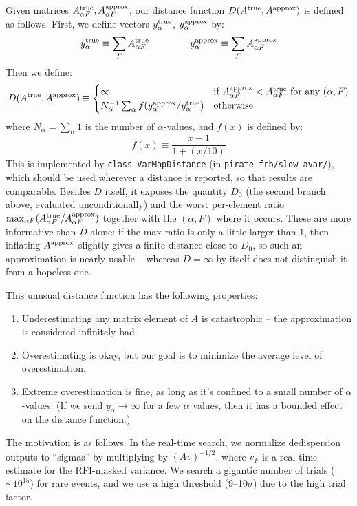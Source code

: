 \documentclass{article}
\numberwithin{equation}{section}   %
\begin{document}
Given matrices $A^{\rm true}_{\alpha F}, A^{\rm approx}_{\alpha F}$,
our distance function $D(A^{\rm true}, A^{\rm approx})$ is defined as follows.
First, we define vectors
$y^{\rm true}_{\alpha}$, $y^{\rm approx}_{\alpha}$ by:
\begin{equation}
y^{\rm true}_{\alpha} \equiv \sum_F A^{\rm true}_{\alpha F}
  \hspace{1.5cm}
y^{\rm approx}_{\alpha} \equiv \sum_F A^{\rm approx}_{\alpha F}
\end{equation}
Then we define:
\begin{equation}
D(A^{\rm true}, A^{\rm approx})
 \equiv \begin{cases}
   \infty & \mbox{if $A^{\rm approx}_{\alpha F} < A^{\rm true}_{\alpha F}$ for any $(\alpha,F)$} \\
   N_\alpha^{-1} \sum_\alpha f(y_\alpha^{\rm approx}/y_\alpha^{\rm true})
    & \mbox{otherwise}
\end{cases} 
\label{eq:distance_function}
\end{equation}
where $N_\alpha = \sum_\alpha 1$ is the number of $\alpha$-values, and $f(x)$ is defined by:
\begin{equation}
f(x) \equiv \frac{x-1}{1+(x/10)}
\end{equation}
This is implemented by \verb|class VarMapDistance| (in \verb|pirate_frb/slow_avar/|),
which should be used wherever a distance is reported, so that results are comparable.
Besides $D$ itself, it exposes the quantity $D_0$ (the second branch above, evaluated
unconditionally) and the worst per-element ratio
$\max_{\alpha F} (A^{\rm true}_{\alpha F} / A^{\rm approx}_{\alpha F})$ together with the
$(\alpha,F)$ where it occurs. These are more informative than $D$ alone: if the max ratio
is only a little larger than $1$, then inflating $A^{\rm approx}$ slightly gives a finite
distance close to $D_0$, so such an approximation is nearly usable -- whereas
$D = \infty$ by itself does not distinguish it from a hopeless one.

This unusual distance function has the following properties:
\begin{enumerate}
\item Underestimating any matrix element of $A$ is catastrophic -- the approximation
 is considered infinitely bad.
\item Overestimating is okay, but our goal is to minimize the average level of
 overestimation.
\item Extreme overestimation is fine, as long as it's confined to a small number
 of $\alpha$-values. (If we send $y_\alpha \rightarrow \infty$ for a few $\alpha$
 values, then it has a bounded effect on the distance function.)
\end{enumerate}
The motivation is as follows.
In the real-time search, we normalize dedispersion outputs to ``sigmas'' by multiplying
by $(Av)^{-1/2}$, where $v_F$ is a real-time estimate for the RFI-masked variance.
We search a gigantic number of trials ($\sim\!10^{15}$) for rare events, and we use
a high threshold (9--10$\sigma$) due to the high trial factor.
\end{document}
